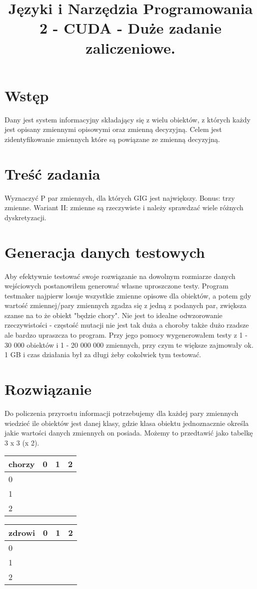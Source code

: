 \documentclass[a4paper]{article}
\title{Języki i Narzędzia Programowania 2 - CUDA - Duże zadanie zaliczeniowe.}
\begin{document}
    \maketitle
    \section{Wstęp}
    Dany jest system informacyjny składający się z wielu obiektów, z których każdy jest opisany zmiennymi opisowymi oraz zmienną decyzyjną. Celem jest zidentyfikowanie zmiennych które są powiązane ze zmienną decyzyjną.
    \section{Treść zadania}
    Wyznaczyć P par zmiennych, dla których GIG jest największy. Bonus: trzy zmienne. Wariant II: zmienne są rzeczywiste i należy sprawdzać wiele różnych dyskretyzacji.
    \section{Generacja danych testowych}
    Aby efektywnie testować swoje rozwiązanie na dowolnym rozmiarze danych wejściowych postanowiłem generować własne uproszczone testy. Program testmaker najpierw losuje wszystkie zmienne opisowe dla obiektów, a potem gdy wartość zmiennej/pary zmiennych zgadza się z jedną z podanych par, zwiększa szanse na to że obiekt "będzie chory". Nie jest to idealne odwzorowanie rzeczywistości - częstość mutacji nie jest tak duża a choroby także dużo rzadsze ale bardzo upraszcza to program.
    Przy jego pomocy wygenerowałem testy z 1 - 30 000 obiektów i 1 - 20 000 000 zmiennych, przy czym te większe zajmowały ok. 1 GB i czas działania był za długi żeby cokolwiek tym testować.
    \section{Rozwiązanie}
    Do policzenia przyrostu informacji potrzebujemy dla każdej pary zmiennych wiedzieć ile obiektów jest danej klasy, gdzie klasa obiektu jednoznacznie określa jakie wartości danych zmiennych on posiada. Możemy to przedtawić jako tabelkę 3 x 3 (x 2).

    \begin{tabular}{|l|r|r|r|}
        \hline
        chorzy & 0 & 1 & 2 \\
        \hline
        0 & & & \\
        \hline
        1 & & & \\
        \hline
        2 & & & \\
        \hline
    \end{tabular}
    \begin{tabular}{|l|r|r|r|}
        \hline
        zdrowi & 0 & 1 & 2 \\
        \hline
        0 & & & \\
        \hline
        1 & & & \\
        \hline
        2 & & & \\
        \hline
    \end{tabular}
\end{document}
